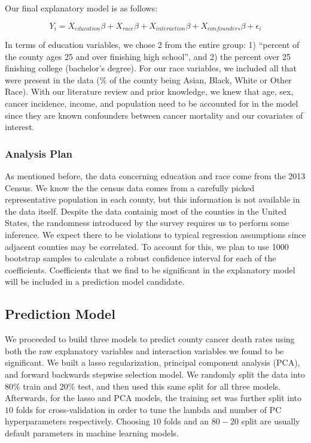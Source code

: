 \documentclass[
  11pt,
]{article}
\begin{document}
Our final explanatory model is as follows:

\[
Y_i = X_{education}\beta + X_{race}\beta + X_{interaction}\beta + X_{confounders}\beta + \epsilon_i
\]

In terms of education variables, we chose 2 from the entire group: 1)
``percent of the county ages 25 and over finishing high school'', and 2)
the percent over 25 finishing college (bachelor's degree). For our race
variables, we included all that were present in the data (\% of the
county being Asian, Black, White or Other Race). With our literature
review and prior knowledge, we knew that age, sex, cancer incidence,
income, and population need to be accounted for in the model since they
are known confounders between cancer mortality and our covariates of
interest.

\hypertarget{analysis-plan}{%
\subsubsection{Analysis Plan}\label{analysis-plan}}

As mentioned before, the data concerning education and race come from
the 2013 Census. We know the the census data comes from a carefully
picked representative population in each county, but this information is
not available in the data itself. Despite the data containig most of the
counties in the United States, the randomness introduced by the survey
requires us to perform some inference. We expect there to be violations
to typical regression assumptions since adjacent counties may be
correlated. To account for this, we plan to use 1000 bootstrap samples
to calculate a robust confidence interval for each of the coefficients.
Coefficients that we find to be significant in the explanatory model
will be included in a prediction model candidate.

\hypertarget{prediction-model}{%
\subsection{Prediction Model}\label{prediction-model}}

We proceeded to build three models to predict county cancer death rates
using both the raw explanatory variables and interaction variables we
found to be significant. We built a lasso regularization, principal
component analysis (PCA), and forward backwards stepwise selection
model. We randomly split the data into 80\% train and 20\% test, and
then used this same split for all three models. Afterwards, for the
lasso and PCA models, the training set was further split into \(10\)
folds for cross-validation in order to tune the lambda and number of PC
hyperparameters respectively. Choosing \(10\) folds and an \(80-20\)
split are usually default parameters in machine learning models.
\end{document}
